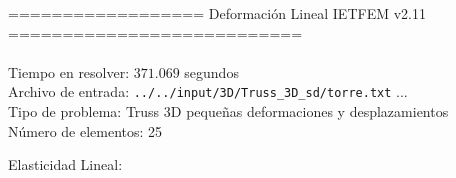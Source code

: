 \documentclass[a4paper,11pt]{article}
\begin{document}

================== Deformación Lineal IETFEM v2.11 ===========================\\\\


Tiempo en resolver: $371.069$ segundos \\

Archivo de entrada: \verb|../../input/3D/Truss_3D_sd/torre.txt|  ... \\

Tipo de problema: Truss 3D pequeñas deformaciones y desplazamientos\\ 

Número de elementos: 25 \\

\newpage       

Elasticidad Lineal:\\
\end{document}
